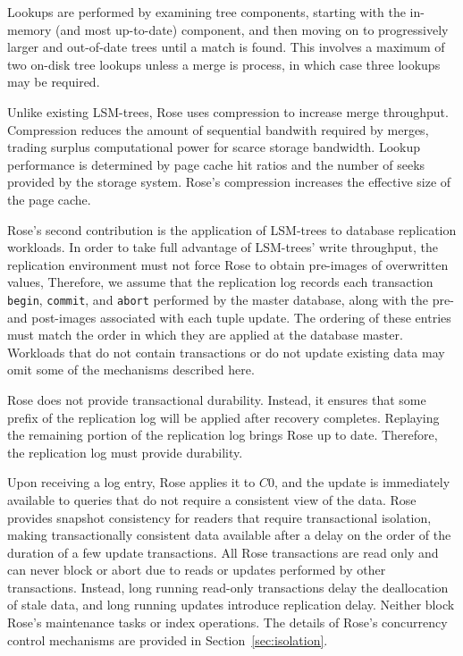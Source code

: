 \documentclass{vldb}
\newcommand{\rows}{Rose\xspace}
\newcommand{\rowss}{Rose's\xspace}
\begin{document}
Lookups are performed by examining tree components, starting with the
in-memory (and most up-to-date) component, and then moving on
to progressively larger and out-of-date trees until a match is found.
This involves a maximum of two on-disk tree lookups unless a merge is
process, in which case three lookups may be required.

Unlike existing LSM-trees, \rows uses compression to increase merge
throughput.  Compression reduces the amount of sequential bandwith
required by merges, trading surplus
computational power for scarce storage bandwidth.  Lookup performance
is determined by page cache hit ratios and the number of seeks
provided by the storage system.  \rowss compression increases the
effective size of the page cache.

\rowss second contribution is the application of LSM-trees to database
replication workloads.  In order to take full advantage of LSM-trees'
write throughput, the replication environment must not force \rows to
obtain pre-images of overwritten values, Therefore, we assume that the
replication log records each transaction {\tt begin}, {\tt commit},
and {\tt abort} performed by the master database, along with the pre-
and post-images associated with each tuple update.  The ordering of
these entries must match the order in which they are applied at the
database master.  Workloads that do not contain transactions or do not
update existing data may omit some of the mechanisms described here.

\rows does not provide transactional durability.  Instead, it ensures
that some prefix of the replication log will be applied after recovery
completes.  Replaying the remaining portion of the replication log
brings \rows up to date.  Therefore, the replication log must provide
durability.

Upon receiving a
log entry, \rows applies it to $C0$, and the update is immediately
available to queries that do not require a consistent view of the
data.  \rows provides snapshot consistency for readers that require
transactional isolation, making transactionally consistent data
available after a delay on the order of the duration of a few update
transactions.  All \rows transactions are read only and can
never block or abort due to reads or updates performed by other transactions.
Instead, long running read-only transactions delay the
deallocation of stale data, and long running updates introduce
replication delay.  Neither block \rowss maintenance tasks or index
operations.  The details of \rowss concurrency control mechanisms are
provided in Section~\ref{sec:isolation}.
\end{document}
